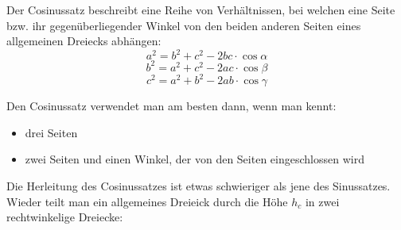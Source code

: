 
Der Cosinussatz beschreibt eine Reihe von Verh\"{a}ltnissen, bei welchen eine Seite bzw. ihr gegen\"{u}berliegender Winkel von den beiden anderen Seiten eines allgemeinen Dreiecks abh\"{a}ngen: $$a^2 = b^2 + c^2 - 2bc \cdot \cos \alpha$$ $$b^2 = a^2 + c^2 - 2ac \cdot \cos \beta$$ $$c^2 = a^2 + b^2 - 2ab \cdot \cos \gamma$$

Den Cosinussatz verwendet man am besten dann, wenn man kennt:
\begin{itemize}
	\item drei Seiten
	\item zwei Seiten und einen Winkel, der von den Seiten eingeschlossen wird
\end{itemize}

\begin{figure}[h!]
\end{figure}

\pagebreak


Die Herleitung des Cosinussatzes ist etwas schwieriger als jene des Sinussatzes. Wieder teilt man ein allgemeines Dreieick durch die H\"{o}he $h_c$ in zwei rechtwinkelige Dreiecke:

